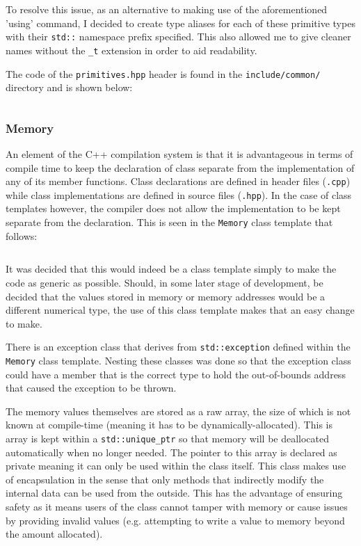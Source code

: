         To resolve this issue, as an alternative to making use of the aforementioned 'using' command, I decided to create type aliases for each of these primitive types with their \texttt{std::} namespace prefix specified. This also allowed me to give cleaner names without the \texttt{\_t} extension in order to aid readability.

        The code of the \texttt{primitives.hpp} header is found in the \texttt{include/common/} directory and is shown below:

        \inputminted{c++}{code/initial/primitives.hpp}

    \subsubsection{Memory}

        An element of the C++ compilation system is that it is advantageous in terms of compile time to keep the declaration of class separate from the implementation of any of its member functions. Class declarations are defined in header files (\texttt{.cpp}) while class implementations are defined in source files (\texttt{.hpp}). In the case of class templates however, the compiler does not allow the implementation to be kept separate from the declaration. This is seen in the \texttt{Memory} class template that follows:

        \inputminted{c++}{code/initial/memory.hpp}

        It was decided that this would indeed be a class template simply to make the code as generic as possible. Should, in some later stage of development, be decided that the values stored in memory or memory addresses would be a different numerical type, the use of this class template makes that an easy change to make.

        There is an exception class that derives from \texttt{std::exception} defined within the \texttt{Memory} class template. Nesting these classes was done so that the exception class could have a member that is the correct type to hold the out-of-bounds address that caused the exception to be thrown.

        The memory values themselves are stored as a raw array, the size of which is not known at compile-time (meaning it has to be dynamically-allocated). This is array is kept within a \texttt{std::unique\_ptr} so that memory will be deallocated automatically when no longer needed. The pointer to this array is declared as private meaning it can only be used within the class itself. This class makes use of encapsulation in the sense that only methods that indirectly modify the internal data can be used from the outside. This has the advantage of ensuring safety as it means users of the class cannot tamper with memory or cause issues by providing invalid values (e.g. attempting to write a value to memory beyond the amount allocated).

